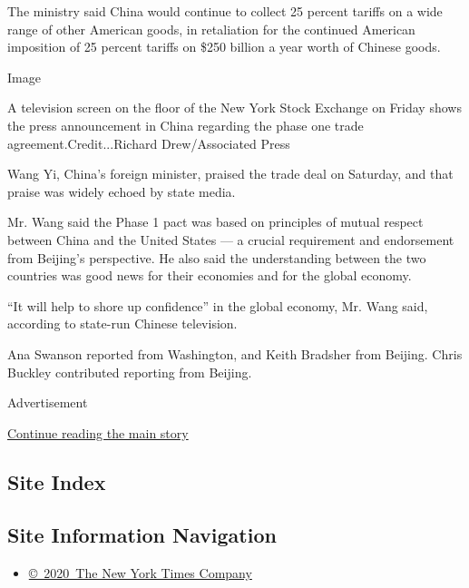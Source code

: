 The ministry said China would continue to collect 25 percent tariffs on
a wide range of other American goods, in retaliation for the continued
American imposition of 25 percent tariffs on \$250 billion a year worth
of Chinese goods.

Image

A television screen on the floor of the New York Stock Exchange on
Friday shows the press announcement in China regarding the phase one
trade agreement.Credit...Richard Drew/Associated Press

Wang Yi, China's foreign minister, praised the trade deal on Saturday,
and that praise was widely echoed by state media.

Mr. Wang said the Phase 1 pact was based on principles of mutual respect
between China and the United States --- a crucial requirement and
endorsement from Beijing's perspective. He also said the understanding
between the two countries was good news for their economies and for the
global economy.

``It will help to shore up confidence'' in the global economy, Mr. Wang
said, according to state-run Chinese television.

Ana Swanson reported from Washington, and Keith Bradsher from Beijing.
Chris Buckley contributed reporting from Beijing.

Advertisement

\protect\hyperlink{after-bottom}{Continue reading the main story}

\hypertarget{site-index}{%
\subsection{Site Index}\label{site-index}}

\hypertarget{site-information-navigation}{%
\subsection{Site Information
Navigation}\label{site-information-navigation}}

\begin{itemize}
\tightlist
\item
  \href{https://help.nytimes.com/hc/en-us/articles/115014792127-Copyright-notice}{©~2020~The
  New York Times Company}
\end{itemize}

